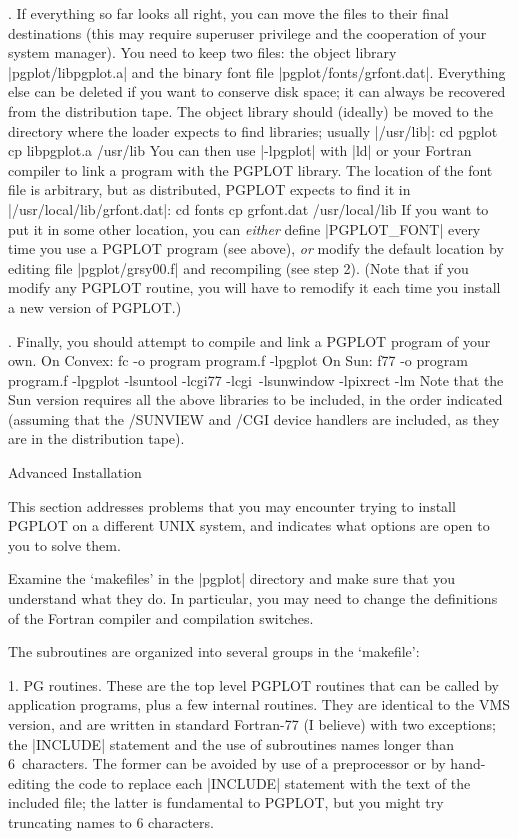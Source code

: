 \bigskip{}.  If everything so far looks all right, you can move the files to 
their final destinations (this may require superuser privilege and the 
cooperation of your system manager). You need to keep two files: the
object library |pgplot/libpgplot.a| and the binary font file
|pgplot/fonts/grfont.dat|. Everything else can be deleted if you want to
conserve disk space; it can always be recovered from the distribution
tape.  The object library should (ideally) be moved to the directory
where the loader expects to find libraries; usually |/usr/lib|: 
\begintt
cd pgplot
cp libpgplot.a /usr/lib
\endtt
You can then use |-lpgplot| with |ld| or your Fortran compiler to
link a program with the PGPLOT library.  The location of the font file 
is arbitrary, but as distributed, PGPLOT expects to find it in 
|/usr/local/lib/grfont.dat|:
\begintt
cd fonts
cp grfont.dat /usr/local/lib
\endtt
If you want to put it in some other location, you can {\it either\/} 
define |PGPLOT_FONT| every time you use a PGPLOT program (see above), 
{\it or\/} modify the default location by editing file |pgplot/grsy00.f|
and recompiling (see step 2). (Note that if you modify any PGPLOT
routine, you will have to remodify it each time you install a new
version of PGPLOT.) 

\bigskip{}. Finally, you should attempt to compile and link a PGPLOT program
of your own. On Convex:
\begintt
fc -o program program.f -lpgplot
\endtt
On Sun:
\begintt
f77 -o program program.f -lpgplot -lsuntool -lcgi77 -lcgi\
    -lsunwindow -lpixrect -lm
\endtt
Note that the Sun version requires all the above libraries to be 
included, in the order indicated (assuming that the /SUNVIEW and /CGI
device handlers are included, as they are in the distribution tape).

\beginsection Advanced Installation

This section addresses problems that you may encounter trying to install 
PGPLOT on a different UNIX system, and indicates what options are open 
to you to solve them.

Examine the `makefiles' in the |pgplot| directory and make sure that you 
understand what they do. In particular, you may need to change the 
definitions of the Fortran compiler and compilation switches.

The subroutines are organized into several groups in the `makefile':
\smallskip
\item{1.} PG routines.  These are the top level PGPLOT routines that 
can be called by application programs, plus a few internal routines.
They are identical to the VMS version, and are written in standard
Fortran-77 (I believe) with two exceptions; the |INCLUDE| statement and
the use of subroutines names longer than 6~characters. The former can be
avoided by use of a preprocessor or by hand-editing the code to replace
each |INCLUDE| statement with the text of the included file; the latter
is fundamental to PGPLOT, but you might try truncating names to 6
characters. 

